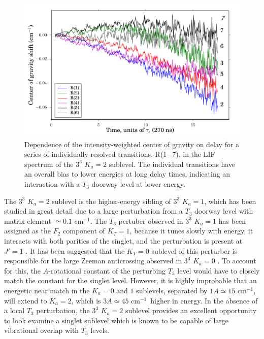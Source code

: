 \documentclass[12pt]{mitthesis}
\newcommand{\rcm}{cm$^{-1}$}
\newcommand{\Ka}[1]{$K_a\!\!=\!#1$}
\begin{document}
\begin{figure}
  \caption{Dependence of the intensity-weighted center of gravity on
    delay for a series of individually resolved transitions, R(1$-$7),
    in the LIF spectrum of the $3^3$ \Ka{2} sublevel.  The individual
    transitions have an overall bias to lower energies at long delay
    times, indicating an interaction with a $T_3$ doorway level at
    lower energy.}
  \label{fig:33k2-cog-delay}
  \centering
  \includegraphics[width=6in]{33k2-r123456-cog-delay.pdf}
\end{figure}


The $3^3$ \Ka{2} sublevel is the higher-energy sibling of $3^3$
\Ka{1}, which has been studied in great detail due to a large
perturbation from a $T_3$ doorway level with matrix element $\simeq
0.1$ \rcm.  The $T_3$ pertuber observed in $3^3$ \Ka{1} has been
assigned as the $F_2$ component of $K_T=1$, because 
it tunes slowly with energy,
it interacts with both parities of the singlet, and
the perturbation is present at $J'=1$
\cite{mishra04}.  It has been suggested that the $K_T=0$ sublevel of
this perturber is responsible for the large Zeeman anticrossing
observed in $3^3$ \Ka{0} \cite{thom07, dupre93}.  To account for this,
the $A$-rotational constant of the perturbing $T_3$ level would have
to closely match the constant for the singlet level.  However, it is
highly improbable that an energetic near match in the $K_a=0$ and $1$
sublevels, separated by $1A \simeq 15$ \rcm, will extend to $K_a=2$,
which is $3A \simeq 45$ \rcm\ higher in energy.  In the absence of a
local $T_3$ perturbation, the $3^3$ \Ka{2} sublevel provides an
excellent opportunity to look examine a singlet sublevel which is
known to be capable of large vibrational overlap with $T_3$ levels.
\end{document}

